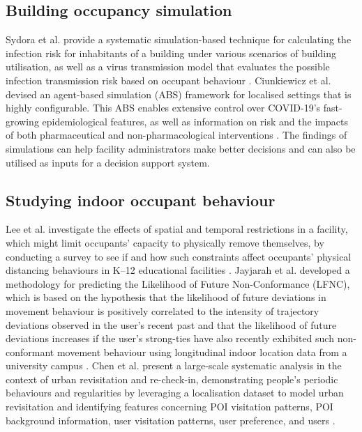 \documentclass[acmtog]{acmart}
\begin{document}
\subsection{Building occupancy simulation}
Sydora et al. provide a systematic simulation-based technique for calculating the infection risk for inhabitants of a building under various scenarios of building utilisation, as well as a virus transmission model that evaluates the possible infection transmission risk based on occupant behaviour \cite{sydora2022building}. Ciunkiewicz et al. devised an agent-based simulation (ABS) framework for localised settings that is highly configurable. This ABS enables extensive control over COVID-19's fast-growing epidemiological features, as well as information on risk and the impacts of both pharmaceutical and non-pharmacological interventions \cite{ciunkiewicz2022agent}. The findings of simulations can help facility administrators make better decisions and can also be utilised as inputs for a decision support system. 

\subsection{Studying indoor occupant behaviour}
Lee et al. investigate the effects of spatial and temporal restrictions in a facility, which might limit occupants' capacity to physically remove themselves, by conducting a survey to see if and how such constraints affect occupants' physical distancing behaviours in K–12 educational facilities \cite{lee2022understanding}. Jayjarah et al. developed a methodology for predicting the Likelihood of Future Non-Conformance (LFNC), which is based on the hypothesis that the likelihood of future deviations in movement behaviour is positively correlated to the intensity of trajectory deviations observed in the user's recent past and that the likelihood of future deviations increases if the user's strong-ties have also recently exhibited such non-conformant movement behaviour using longitudinal indoor location data from a university campus \cite{jayarajah2018predicting}. Chen et al. present a large-scale systematic analysis in the context of urban revisitation and re-check-in, demonstrating people's periodic behaviours and regularities by leveraging a localisation dataset to model urban revisitation and identifying features concerning POI visitation patterns, POI background information, user visitation patterns, user preference, and users \cite{chen2020will}.
\end{document}
